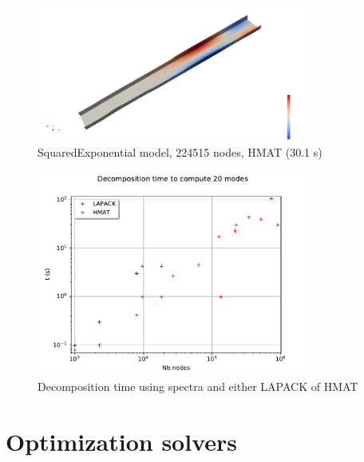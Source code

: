 \documentclass{beamer}
\begin{document}
\begin{frame}
\begin{figure}
\begin{center}
\includegraphics[width=0.8\textwidth]{figures/kl_large_hmat.png}
\end{center}
\caption{SquaredExponential model, 224515 nodes, HMAT (30.1 s)}
\end{figure}

\begin{figure}
\begin{center}
\includegraphics[width=0.8\textwidth]{figures/Decomposition.pdf}
\end{center}
\caption{Decomposition time using spectra and either LAPACK of HMAT}
\end{figure}

\end{frame}


\section{Optimization solvers}

\end{document}
